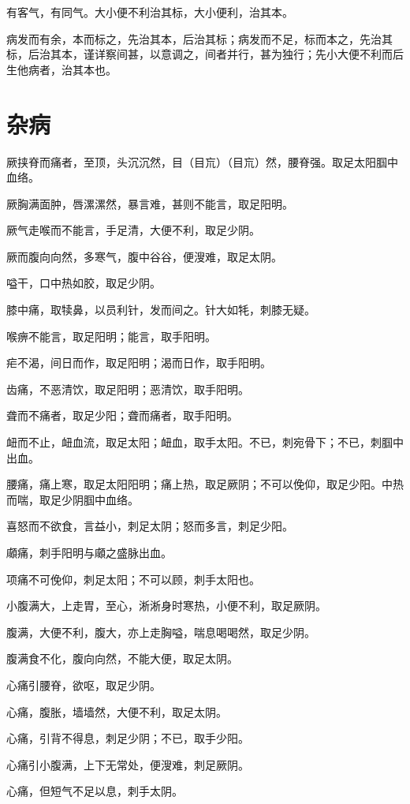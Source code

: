 \documentclass[a4paper,12pt,UTF8,twoside]{ctexbook}
\begin{document}
	有客气，有同气。大小便不利治其标，大小便利，治其本。
	
	病发而有余，本而标之，先治其本，后治其标；病发而不足，标而本之，先治其标，后治其本，谨详察间甚，以意调之，间者并行，甚为独行；先小大便不利而后生他病者，治其本也。
	\chapter{杂病}
	
	厥挟脊而痛者，至顶，头沉沉然，目（目巟）（目巟）然，腰脊强。取足太阳腘中血络。
	
	厥胸满面肿，唇漯漯然，暴言难，甚则不能言，取足阳明。
	
	厥气走喉而不能言，手足清，大便不利，取足少阴。
	
	厥而腹向向然，多寒气，腹中谷谷，便溲难，取足太阴。
	
	嗌干，口中热如胶，取足少阴。
	
	膝中痛，取犊鼻，以员利针，发而间之。针大如牦，刺膝无疑。
	
	喉痹不能言，取足阳明；能言，取手阳明。
	
	疟不渴，间日而作，取足阳明；渴而日作，取手阳明。
	
	齿痛，不恶清饮，取足阳明；恶清饮，取手阳明。
	
	聋而不痛者，取足少阳；聋而痛者，取手阳明。
	
	衄而不止，衄血流，取足太阳；衄血，取手太阳。不已，刺宛骨下；不已，刺腘中出血。
	
	腰痛，痛上寒，取足太阳阳明；痛上热，取足厥阴；不可以俛仰，取足少阳。中热而喘，取足少阴腘中血络。
	
	喜怒而不欲食，言益小，刺足太阴；怒而多言，刺足少阳。
	
	顑痛，刺手阳明与顑之盛脉出血。
	
	项痛不可俛仰，刺足太阳；不可以顾，刺手太阳也。
	
	小腹满大，上走胃，至心，淅淅身时寒热，小便不利，取足厥阴。
	
	腹满，大便不利，腹大，亦上走胸嗌，喘息喝喝然，取足少阴。
	
	腹满食不化，腹向向然，不能大便，取足太阴。
	
	心痛引腰脊，欲呕，取足少阴。
	
	心痛，腹胀，墙墙然，大便不利，取足太阴。
	
	心痛，引背不得息，刺足少阴；不已，取手少阳。
	
	心痛引小腹满，上下无常处，便溲难，刺足厥阴。
	
	心痛，但短气不足以息，刺手太阴。
	
\end{document}
